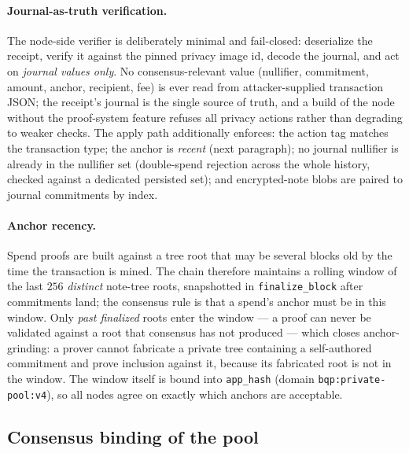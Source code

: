 \documentclass[11pt]{article}
\newcommand{\code}[1]{\texttt{#1}}
\theoremstyle{plain}
\theoremstyle{definition}
\theoremstyle{remark}
\begin{document}
\paragraph{Journal-as-truth verification.} The node-side verifier is
deliberately minimal and fail-closed: deserialize the receipt, verify it
against the pinned privacy image id, decode the journal, and act on
\emph{journal values only}. No consensus-relevant value (nullifier,
commitment, amount, anchor, recipient, fee) is ever read from
attacker-supplied transaction JSON; the receipt's journal is the single
source of truth, and a build of the node without the proof-system feature
refuses all privacy actions rather than degrading to weaker checks. The
apply path additionally enforces: the action tag matches the transaction
type; the anchor is \emph{recent} (next paragraph); no journal nullifier is
already in the nullifier set (double-spend rejection across the whole
history, checked against a dedicated persisted set); and encrypted-note
blobs are paired to journal commitments by index.

\paragraph{Anchor recency.} Spend proofs are built against a tree root that
may be several blocks old by the time the transaction is mined. The chain
therefore maintains a rolling window of the last $256$ \emph{distinct}
note-tree roots, snapshotted in \code{finalize\_block} after commitments
land; the consensus rule is that a spend's anchor must be in this window.
Only \emph{past finalized} roots enter the window --- a proof can never be
validated against a root that consensus has not produced --- which closes
anchor-grinding: a prover cannot fabricate a private tree containing a
self-authored commitment and prove inclusion against it, because its
fabricated root is not in the window. The window itself is bound into
\code{app\_hash} (domain \code{bqp:private-pool:v4}), so all nodes agree on
exactly which anchors are acceptable.

\subsection{Consensus binding of the pool}
\label{sec:consensus-binding}
\end{document}
